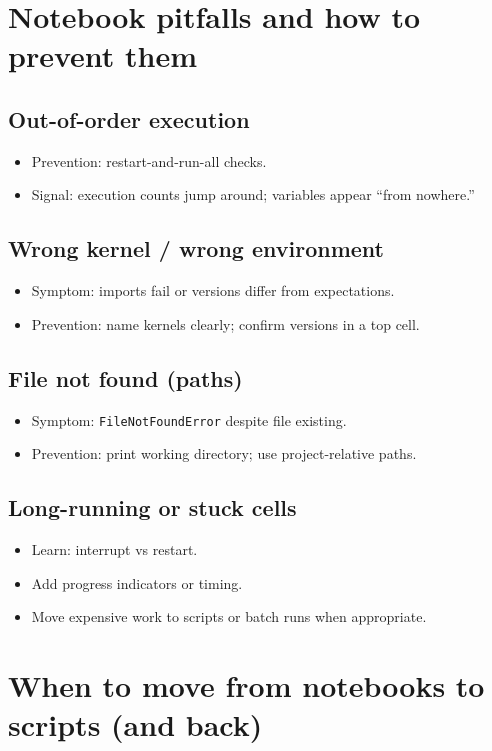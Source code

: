 \section{Notebook pitfalls and how to prevent them}
\subsection{Out-of-order execution}
\begin{itemize}
\item Prevention: restart-and-run-all checks.
\item Signal: execution counts jump around; variables appear ``from nowhere.''
\end{itemize}

\subsection{Wrong kernel / wrong environment}
\begin{itemize}
\item Symptom: imports fail or versions differ from expectations.
\item Prevention: name kernels clearly; confirm versions in a top cell.
\end{itemize}

\subsection{File not found (paths)}
\begin{itemize}
\item Symptom: \texttt{FileNotFoundError} despite file existing.
\item Prevention: print working directory; use project-relative paths.
\end{itemize}

\subsection{Long-running or stuck cells}
\begin{itemize}
\item Learn: interrupt vs restart.
\item Add progress indicators or timing.
\item Move expensive work to scripts or batch runs when appropriate.
\end{itemize}

\section{When to move from notebooks to scripts (and back)}
